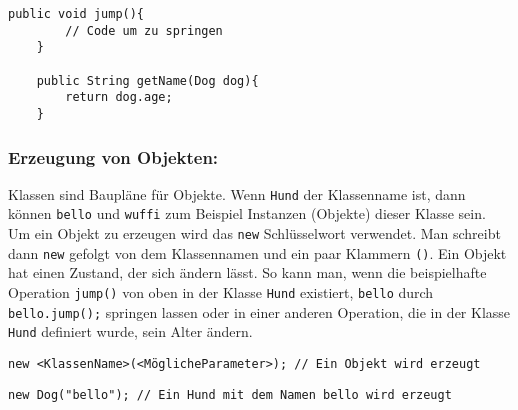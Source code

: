 \newpage

\begin{lstlisting}[title=\textbf{Beispiel: Operationen}]
	public void jump(){
		// Code um zu springen
	}

	public String getName(Dog dog){
		return dog.age;
	}
\end{lstlisting}

\begin{Infobox}
	\subsubsection*{Erzeugung von Objekten:}
	Klassen sind Baupläne für Objekte. Wenn \lstinline{Hund} der Klassenname ist, dann können \lstinline{bello} und \lstinline{wuffi} zum Beispiel Instanzen (Objekte) dieser Klasse sein.\newline
	Um ein Objekt zu erzeugen wird das \lstinline{new} Schlüsselwort verwendet.
	Man schreibt dann \lstinline{new} gefolgt von dem Klassennamen und ein paar Klammern \lstinline{()}.\newline
	Ein Objekt hat einen Zustand, der sich ändern lässt. So kann man, wenn die beispielhafte Operation \lstinline{jump()} von oben in der Klasse \lstinline{Hund} existiert, \lstinline{bello} durch \lstinline{bello.jump();} springen lassen oder in einer anderen Operation, die in der Klasse \lstinline{Hund} definiert wurde, sein Alter ändern.
\end{Infobox}

\begin{lstlisting}[title=\textbf{Syntax Objekt Erstellung}]
	new <KlassenName>(<MöglicheParameter>); // Ein Objekt wird erzeugt
\end{lstlisting}

\begin{lstlisting}[title=\textbf{Beispiel: Objekt Erstellung}]
	new Dog("bello"); // Ein Hund mit dem Namen bello wird erzeugt
\end{lstlisting}

